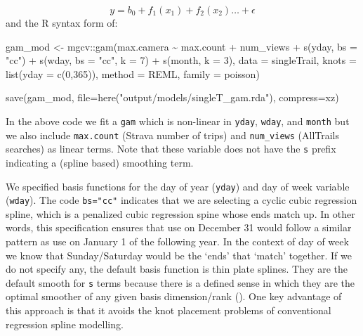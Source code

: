 \documentclass[
]{book}
\newenvironment{Shaded}{\begin{snugshade}}{\end{snugshade}}
\newcommand{\AttributeTok}[1]{\textcolor[rgb]{0.77,0.63,0.00}{#1}}
\newcommand{\DecValTok}[1]{\textcolor[rgb]{0.00,0.00,0.81}{#1}}
\newcommand{\FunctionTok}[1]{\textcolor[rgb]{0.00,0.00,0.00}{#1}}
\newcommand{\NormalTok}[1]{#1}
\newcommand{\OtherTok}[1]{\textcolor[rgb]{0.56,0.35,0.01}{#1}}
\newcommand{\SpecialCharTok}[1]{\textcolor[rgb]{0.00,0.00,0.00}{#1}}
\newcommand{\StringTok}[1]{\textcolor[rgb]{0.31,0.60,0.02}{#1}}
\begin{document}
\[
y = b_0 + f_1(x_1) + f_2(x_2)\dots + \epsilon
\]
and the R syntax form of:

\begin{Shaded}
\begin{Highlighting}[]
\NormalTok{gam\_mod }\OtherTok{\textless{}{-}}\NormalTok{ mgcv}\SpecialCharTok{::}\FunctionTok{gam}\NormalTok{(max.camera }\SpecialCharTok{\textasciitilde{}} 
\NormalTok{                       max.count }\SpecialCharTok{+}
\NormalTok{                       num\_views }\SpecialCharTok{+}
                       \FunctionTok{s}\NormalTok{(yday, }\AttributeTok{bs =} \StringTok{"cc"}\NormalTok{) }\SpecialCharTok{+} 
                       \FunctionTok{s}\NormalTok{(wday, }\AttributeTok{bs =} \StringTok{"cc"}\NormalTok{,  }\AttributeTok{k =} \DecValTok{7}\NormalTok{) }\SpecialCharTok{+}
                       \FunctionTok{s}\NormalTok{(month, }\AttributeTok{k =} \DecValTok{3}\NormalTok{), }
                     \AttributeTok{data =}\NormalTok{ singleTrail, }
                     \AttributeTok{knots =} \FunctionTok{list}\NormalTok{(}\AttributeTok{yday =} \FunctionTok{c}\NormalTok{(}\DecValTok{0}\NormalTok{,}\DecValTok{365}\NormalTok{)),}
                     \AttributeTok{method =} \StringTok{\textquotesingle{}REML\textquotesingle{}}\NormalTok{,}
                     \AttributeTok{family =}\NormalTok{ poisson)}

\FunctionTok{save}\NormalTok{(gam\_mod, }
     \AttributeTok{file=}\FunctionTok{here}\NormalTok{(}\StringTok{"output/models/singleT\_gam.rda"}\NormalTok{), }
     \AttributeTok{compress=}\StringTok{\textquotesingle{}xz\textquotesingle{}}\NormalTok{)}
\end{Highlighting}
\end{Shaded}

In the above code we fit a \texttt{gam} which is non-linear in \texttt{yday}, \texttt{wday}, and \texttt{month} but we also include \texttt{max.count} (Strava number of trips) and \texttt{num\_views} (AllTrails searches) as linear terms. Note that these variable does not have the \texttt{s} prefix indicating a (spline based) smoothing term.

We specified basis functions for the day of year (\texttt{yday}) and day of week variable (\texttt{wday}). The code \texttt{bs="cc"} indicates that we are selecting a cyclic cubic regression spline, which is a penalized cubic regression spine whose ends match up. In other words, this specification ensures that use on December 31 would follow a similar pattern as use on January 1 of the following year. In the context of day of week we know that Sunday/Saturday would be the `ends' that `match' together. If we do not specify any, the default basis function is thin plate splines. They are the default smooth for \texttt{s} terms because there is a defined sense in which they are the optimal smoother of any given basis dimension/rank (\citep{R-Wood5}). One key advantage of this approach is that it avoids the knot placement problems of conventional regression spline modelling.
\end{document}
